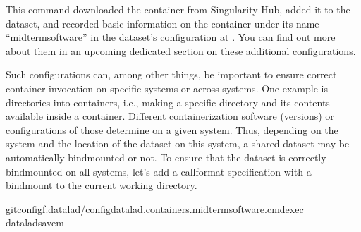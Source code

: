 \sphinxAtStartPar
This command downloaded the container from Singularity Hub, added it to
the  dataset, and recorded basic information on the
container under its name “midterm\sphinxhyphen{}software” in the dataset’s configuration at
. You can find out more about them in an upcoming dedicated section on these additional configurations.

\sphinxAtStartPar
Such configurations can, among other things, be important to ensure correct container invocation on specific systems or across systems.
One example is  directories into containers, i.e., making a specific directory and its contents available inside a container.
Different containerization software (versions) or configurations of those determine  on a given system.
Thus, depending on the system and the location of the dataset on this system, a shared dataset may be automatically bind\sphinxhyphen{}mounted or not.
To ensure that the dataset is correctly bind\sphinxhyphen{}mounted on all systems, let’s add a call\sphinxhyphen{}format specification with a bind\sphinxhyphen{}mount to the current working directory.

\ignorespaces 
\def\sphinxLiteralBlockLabel{\label{\detokenize{basics/101-133-containersrun:index-6}}}
\begin{sphinxVerbatim}[commandchars=\\\{\}]
gitconfig\PYGZhy{}f.datalad/configdatalad.containers.midterm\PYGZhy{}software.cmdexec
dataladsave\PYGZhy{}m
\end{sphinxVerbatim}

